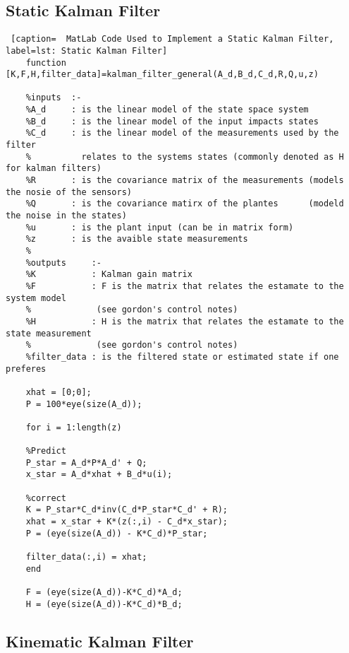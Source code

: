    
      \subsection{Static Kalman Filter}\label{sec: static Kalman Filter}
      
      \begin{lstlisting} [caption=  MatLab Code Used to Implement a Static Kalman Filter, label=lst: Static Kalman Filter]
    function [K,F,H,filter_data]=kalman_filter_general(A_d,B_d,C_d,R,Q,u,z)
    
    %inputs  :-
    %A_d     : is the linear model of the state space system
    %B_d     : is the linear model of the input impacts states
    %C_d     : is the linear model of the measurements used by the filter
    %          relates to the systems states (commonly denoted as H for kalman filters)
    %R       : is the covariance matrix of the measurements (models the nosie of the sensors)
    %Q       : is the covariance matirx of the plantes      (modeld the noise in the states)
    %u       : is the plant input (can be in matrix form)
    %z       : is the avaible state measurements 
    %
    %outputs     :- 
    %K           : Kalman gain matrix
    %F           : F is the matrix that relates the estamate to the system model 
    %             (see gordon's control notes)
    %H           : H is the matrix that relates the estamate to the state measurement 
    %             (see gordon's control notes)
    %filter_data : is the filtered state or estimated state if one preferes
    
    xhat = [0;0];
    P = 100*eye(size(A_d));
    
    for i = 1:length(z)
    
    %Predict
    P_star = A_d*P*A_d' + Q;
    x_star = A_d*xhat + B_d*u(i);
    
    %correct
    K = P_star*C_d*inv(C_d*P_star*C_d' + R);
    xhat = x_star + K*(z(:,i) - C_d*x_star);
    P = (eye(size(A_d)) - K*C_d)*P_star;
    
    filter_data(:,i) = xhat;
    end
    
    F = (eye(size(A_d))-K*C_d)*A_d;
    H = (eye(size(A_d))-K*C_d)*B_d;
          \end{lstlisting}
          
   
   
   
   
   \subsection{Kinematic Kalman Filter}\label{sec: Kinematic Kalman Filter}
   
